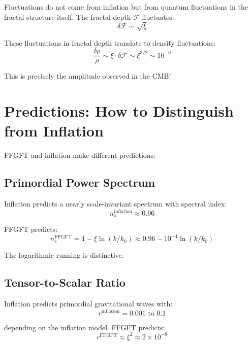 Fluctuations do not come from inflation but from quantum fluctuations in the fractal structure itself. The fractal depth $\mathcal{F}$ fluctuates:
\begin{equation}
\delta \mathcal{F} \sim \sqrt{\xi}
\end{equation}

These fluctuations in fractal depth translate to density fluctuations:
\begin{equation}
\frac{\delta \rho}{\rho} \sim \xi \cdot \delta \mathcal{F} \sim \xi^{3/2} \sim 10^{-6}
\end{equation}

This is precisely the amplitude observed in the CMB!

\section{Predictions: How to Distinguish from Inflation}

FFGFT and inflation make different predictions:

\subsection{Primordial Power Spectrum}

Inflation predicts a nearly scale-invariant spectrum with spectral index:
\begin{equation}
n_s^{\text{inflation}} \approx 0.96
\end{equation}

FFGFT predicts:
\begin{equation}
n_s^{\text{FFGFT}} = 1 - \xi \ln(k/k_0) \approx 0.96 - 10^{-4} \ln(k/k_0)
\end{equation}

The logarithmic running is distinctive.

\subsection{Tensor-to-Scalar Ratio}

Inflation predicts primordial gravitational waves with:
\begin{equation}
r^{\text{inflation}} = 0.001 \text{ to } 0.1
\end{equation}

depending on the inflation model. FFGFT predicts:
\begin{equation}
r^{\text{FFGFT}} \approx \xi^2 \approx 2 \times 10^{-8}
\end{equation}

